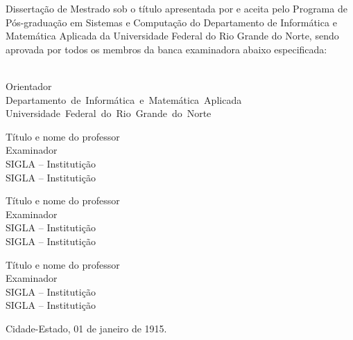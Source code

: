 \begin{folhadeaprovacao}

	
	\noindent 
	Dissertação de Mestrado sob o título \textit{ \Titulo } apresentada por \textbf{ \Autor} e aceita pelo Programa de Pós-graduação em Sistemas e Computação do Departamento de Informática e Matemática Aplicada da Universidade Federal do Rio Grande do Norte, sendo aprovada por todos os membros da banca examinadora abaixo especificada:
		
\begin{center}
    \assinatura
	{
		{\Orientador}\\
        {\small Orientador}	\\
		{\footnotesize
			\mbox{Departamento de Informática e Matemática Aplicada}\\ 
		  	\mbox{Universidade Federal do Rio Grande do Norte}
		}
   }
\end{center}
\begin{center}
    \assinatura
	{
		Título e nome do professor  			                  \\
		{\small Examinador}											          \smallskip\\ 
		{\footnotesize
			SIGLA -- Institutição		   \\
		  	SIGLA -- Institutição
		}
   }   
\end{center}
\begin{center}
    \assinatura
	{
		Título e nome do professor  			                  \\
		{\small Examinador}											          \smallskip\\ 
	    {\footnotesize
			SIGLA -- Institutição		   \\
		  	SIGLA -- Institutição
		}
	}
\end{center}
\begin{center}
    \assinatura
	{
		Título e nome do professor  			                  \\
		{\small Examinador}											          \smallskip\\ 
		{\footnotesize
			SIGLA -- Institutição		   \\
		  	SIGLA -- Institutição
		}
	}
\end{center} 
	\vfill
	
	\begin{center}
		Cidade-Estado, 01 de janeiro de 1915.
	\end{center}
\end{folhadeaprovacao}


